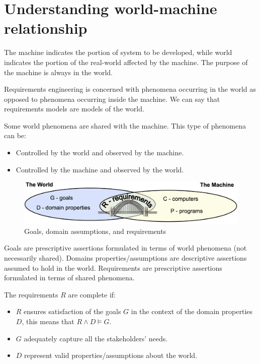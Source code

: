 \documentclass[12pt, a4paper]{report}
\newtheorem[style=M,bodystyle=\normalfont]{theorem}{Theorem}
\newtheorem[style=M,bodystyle=\normalfont]{corollary}{Corollary}
\newtheorem[style=M,bodystyle=\normalfont]{lemma}{Lemma}
\newtheorem[style=M,bodystyle=\normalfont]{definition}{Definition}
\begin{document}
\section{Understanding world-machine relationship}
    The machine indicates the portion of system to be developed, while world indicates the portion of the real-world affected by the machine. The purpose of the machine is always in the world. 
    \par
    Requirements engineering is concerned with phenomena occurring in the world as opposed to phenomena occurring inside the machine. We can say that requirements models are models of the world. 
    \par
    Some world phenomena are shared with the machine. This type of phenomena can be: 
    \begin{itemize}
        \item Controlled by the world and observed by the machine.
        \item Controlled by the machine and observed by the world.
    \end{itemize}
    \begin{figure}
        \centering
        \includegraphics[width=1\linewidth]{images/worldmachine.png}
        \caption{Goals, domain assumptions, and requirements}
    \end{figure}
    Goals are prescriptive assertions formulated in terms of world phenomena (not necessarily shared). Domains properties/assumptions are descriptive assertions assumed to hold in the world. Requirements are prescriptive assertions formulated in terms of shared phenomena. 
    \par 
    The requirements $R$ are complete if: 
    \begin{itemize}
        \item $R$ ensures satisfaction of the goals $G$ in the context of the domain properties $D$, this means that $R\land D \models G$.
        \item $G$ adequately capture all the stakeholders' needs.
        \item $D$ represent valid properties/assumptions about the world.
    \end{itemize}
\end{document}
